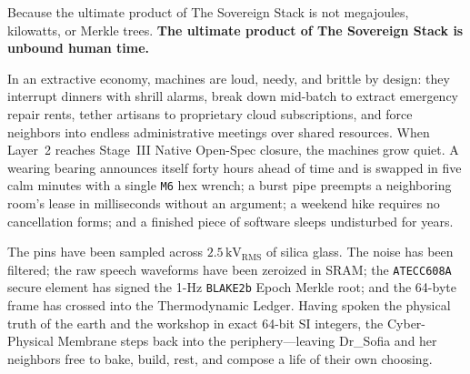 Because the ultimate product of The Sovereign Stack is not megajoules, kilowatts, or Merkle trees. \textbf{The ultimate product of The Sovereign Stack is unbound human time.}

In an extractive economy, machines are loud, needy, and brittle by design: they interrupt dinners with shrill alarms, break down mid-batch to extract emergency repair rents, tether artisans to proprietary cloud subscriptions, and force neighbors into endless administrative meetings over shared resources. When Layer~2 reaches Stage~III Native Open-Spec closure, the machines grow quiet. A wearing bearing announces itself forty hours ahead of time and is swapped in five calm minutes with a single \texttt{M6} hex wrench; a burst pipe preempts a neighboring room's lease in milliseconds without an argument; a weekend hike requires no cancellation forms; and a finished piece of software sleeps undisturbed for years.

The pins have been sampled across $2.5\,\mathrm{kV}_{\mathrm{RMS}}$ of silica glass. The noise has been filtered; the raw speech waveforms have been zeroized in SRAM; the \texttt{ATECC608A} secure element has signed the 1-Hz \texttt{BLAKE2b} Epoch Merkle root; and the 64-byte frame has crossed  into the Thermodynamic Ledger. Having spoken the physical truth of the earth and the workshop in exact 64-bit SI integers, the Cyber-Physical Membrane steps back into the periphery---leaving Dr\_Sofia and her neighbors free to bake, build, rest, and compose a life of their own choosing.
